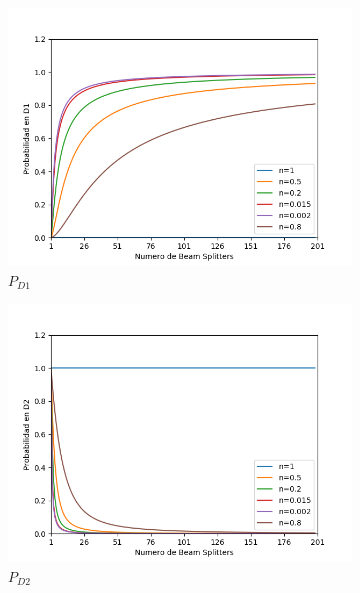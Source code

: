 \documentclass[11pt]{article}
\begin{document}
  \begin{figure}[h!]
\centering
\begin{subfigure}[b]{0.45\linewidth}
\includegraphics[width=\linewidth]{ChopperD1.png}
\caption{$P_{D1}$}
\label{fig:BS1}
\end{subfigure}
\begin{subfigure}[b]{0.45\linewidth}
\includegraphics[width=\linewidth]{ChopperD2.png}
\caption{$P_{D2}$}
\label{fig:westminster_aerea}
\end{subfigure}
\begin{subfigure}[b]{0.45\linewidth}

\end{subfigure}
\end{figure}
\end{document}
